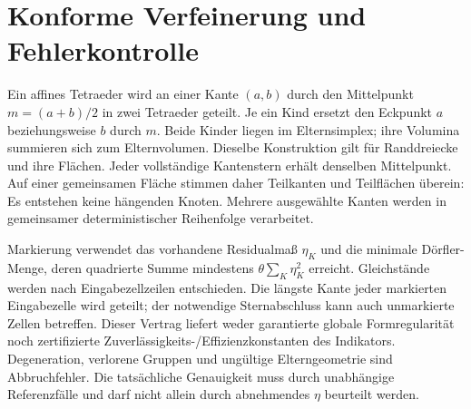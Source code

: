 \chapter{Konforme Verfeinerung und Fehlerkontrolle}\label{theory:adaptive}
Ein affines Tetraeder wird an einer Kante \((a,b)\) durch den Mittelpunkt
\(m=(a+b)/2\) in zwei Tetraeder geteilt. Je ein Kind ersetzt den Eckpunkt
\(a\) beziehungsweise \(b\) durch \(m\). Beide Kinder liegen im Elternsimplex;
ihre Volumina summieren sich zum Elternvolumen. Dieselbe Konstruktion gilt für
Randdreiecke und ihre Flächen. Jeder vollständige Kantenstern erhält denselben
Mittelpunkt. Auf einer gemeinsamen Fläche stimmen daher Teilkanten und Teilflächen
überein: Es entstehen keine hängenden Knoten. Mehrere ausgewählte Kanten werden
in gemeinsamer deterministischer Reihenfolge verarbeitet.

Markierung verwendet das vorhandene Residualmaß \(\eta_K\) und die minimale
Dörfler-Menge, deren quadrierte Summe mindestens \(\theta\sum_K\eta_K^2\) erreicht.
Gleichstände werden nach Eingabezellzeilen entschieden. Die längste Kante jeder
markierten Eingabezelle wird geteilt; der notwendige Sternabschluss kann auch
unmarkierte Zellen betreffen. Dieser Vertrag liefert weder garantierte globale
Formregularität noch zertifizierte Zuverlässigkeits-/Effizienzkonstanten des
Indikators. Degeneration, verlorene Gruppen und ungültige Elterngeometrie sind
Abbruchfehler. Die tatsächliche Genauigkeit muss durch unabhängige Referenzfälle
und darf nicht allein durch abnehmendes \(\eta\) beurteilt werden.
